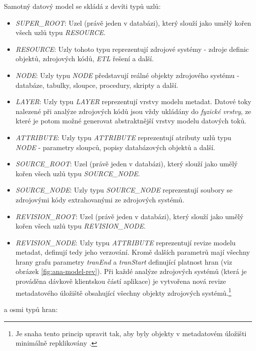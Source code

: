 Samotný datový model se skládá z devíti typů uzlů:

\begin{itemize}
	\item{\textit{SUPER\_ROOT}}: Uzel (právě jeden v databázi), který slouží jako umělý kořen všech uzlů typu \textit{RESOURCE}.
	\item{\textit{RESOURCE}}: Uzly tohoto typu reprezentují zdrojové systémy - zdroje definic objektů, zdrojových kódů, \textit{ETL} řešení a další.
	\item{\textit{NODE}}: Uzly typu \textit{NODE} představují reálné objekty zdrojového systému - databáze, tabulky, sloupce, procedury, skripty a další.
	\item{\textit{LAYER}}: Uzly typu \textit{LAYER} reprezentují vrstvy modelu metadat. Datové toky nalezené při analýze zdrojových kódů jsou vždy ukládány do \textit{fyzické vrstvy}, ze které je potom možné generovat abstraktnější vrstvy modelu datových toků.
	\item{\textit{ATTRIBUTE}}: Uzly typu \textit{ATTRIBUTE} reprezentují atributy uzlů typu \textit{NODE} - parametry sloupců, popisy databázových objektů a další.
	\item{\textit{SOURCE\_ROOT}}: Uzel (právě jeden v databázi), který slouží jako umělý kořen všech uzlů typu \textit{SOURCE\_NODE}.
	\item{\textit{SOURCE\_NODE}}: Uzly typu \textit{SOURCE\_NODE} reprezentují soubory se zdrojovými kódy extrahovanými ze zdrojových systémů.
	\item{\textit{REVISION\_ROOT}}: Uzel (právě jeden v databázi), který slouží jako umělý kořen všech uzlů typu \textit{REVISION\_NODE}.
	\item{\textit{REVISION\_NODE}}: Uzly typu \textit{ATTRIBUTE} reprezentují revize modelu metadat, definují tedy jeho verzování. Kromě dalších parametrů mají všechny hrany grafu parametry \textit{tranEnd} a \textit{tranStart} definující platnost hran (viz obrázek \ref{fig:ana-model-rev}). Při každé analýze zdrojových systémů (která je prováděna dávkově klientskou částí aplikace) je vytvořena nová revize metadatového úložiště obsahující všechny objekty zdrojových systémů.\footnote{Je snaha tento princip upravit tak, aby byly objekty v metadatovém úložišti minimálně repklikovány \cite{Sykora17}.}
\end{itemize}

 a osmi typů hran:

